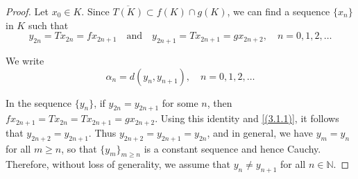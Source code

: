 \documentclass[a4paper,12pt,oneside]{article}
\numberwithin{equation}{section}
\begin{document}
\begin{proof}
Let $x_0 \in K$. Since $\overline{T(K)} \subset f(K) \cap g(K)$, we can find a sequence $\{x_n\}$ in $K$ such that
\begin{equation}
y_{2n} = Tx_{2n} = fx_{2n+1} \quad \text{and} \quad y_{2n+1} = Tx_{2n+1} = gx_{2n+2}, \quad n=0,1,2,\ldots
\end{equation}

We write
\begin{equation}
\alpha_n = d(y_n, y_{n+1}), \quad n=0,1,2,\ldots
\end{equation}

In the sequence $\{y_n\}$, if $y_{2n} = y_{2n+1}$ for some $n$, then $fx_{2n+1} = Tx_{2n} = Tx_{2n+1} = gx_{2n+2}$. Using this identity and \eqref{(3.1.1)}, it follows that $y_{2n+2} = y_{2n+1}$. Thus $y_{2n+2} = y_{2n+1} = y_{2n}$, and in general, we have $y_m = y_n$ for all $m \geq n$, so that $\{y_m\}_{m \geq n}$ is a constant sequence and hence Cauchy. Therefore, without loss of generality, we assume that $y_n \neq y_{n+1}$ for all $n \in \mathbb{N}$.


\end{proof}
\end{document}
